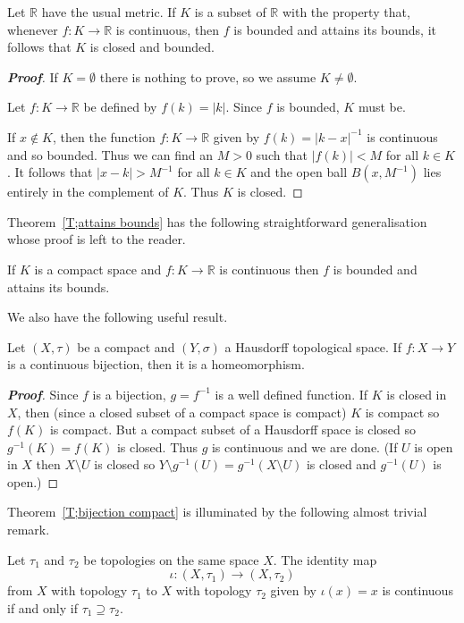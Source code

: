 \begin{theorem}\label{T;converse attains bounds} 
Let ${\mathbb R}$ have the usual metric.
If $K$ is a subset of ${\mathbb R}$ with the property
that, whenever $f:K\rightarrow{\mathbb R}$ is continuous,
then $f$ is bounded and attains its bounds, it follows
that $K$ is closed and bounded.
\end{theorem} 
\begin{proof}[\bf Proof] If $K=\emptyset$ there is nothing to prove,
so we assume $K\neq\emptyset$.

Let $f:K\rightarrow {\mathbb R}$ be defined by
$f(k)=|k|$. Since $f$ is bounded, $K$ must be.

If $x\notin K$, then the function $f:K\rightarrow {\mathbb R}$
given by $f(k)=|k-x|^{-1}$ is continuous and so bounded.
Thus we can find an $M>0$ such that $|f(k)|<M$ for all $k\in K$.
It follows that $|x-k|> M^{-1}$ for all $k\in K$
and the open ball $B(x,M^{-1})$ lies entirely in the complement
of $K$. Thus $K$ is closed.
\end{proof}



Theorem~\ref{T;attains bounds}
has the following straightforward generalisation
whose proof is left to the reader.
\begin{theorem}\label{T;compact attains bounds}
If $K$ is a compact space
and $f:K\rightarrow{\mathbb R}$ is continuous
then $f$ is bounded and attains its bounds.
\end{theorem}
 
We also have the following useful result.


\begin{theorem}\label{T;bijection compact}
Let $(X,\tau)$ be a compact and $(Y,\sigma)$
a Hausdorff topological space. If $f:X\rightarrow Y$ 
is a continuous bijection, then it is a homeomorphism.
\end{theorem}

\begin{proof}[\bf Proof] Since $f$ is a bijection, $g=f^{-1}$ is a well 
defined function. If $K$ is closed in $X$, then (since a closed
subset of a compact space is compact) $K$ is compact
so $f(K)$ is compact. But a compact subset of a Hausdorff 
space is closed so $g^{-1}(K)=f(K)$ is closed. Thus
$g$ is continuous and we are done. (If $U$ is open in $X$
then $X\setminus U$ is closed so $Y\setminus g^{-1}(U)=g^{-1}(X\setminus U)$
is closed and $g^{-1}(U)$ is open.)
\end{proof}
 
Theorem~\ref{T;bijection compact} is illuminated by the following 
almost trivial remark.
\begin{lemma} Let $\tau_{1}$ and $\tau_{2}$ be topologies
on the same space $X$. The identity map
\[\iota:(X,\tau_{1})\rightarrow(X,\tau_{2})\]
from $X$ with topology $\tau_{1}$ to 
$X$ with topology $\tau_{2}$ given by $\iota(x)=x$
is continuous if and only if $\tau_{1}\supseteq\tau_{2}$.
\end{lemma} 

